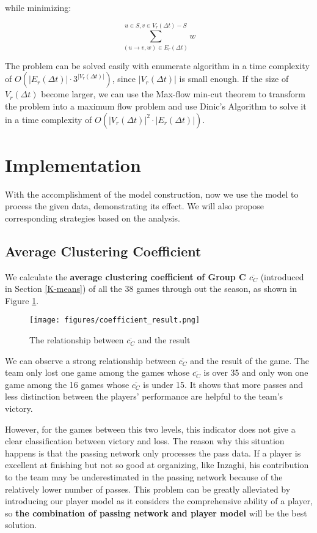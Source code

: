 \documentclass{mcmthesis}
\begin{document}
while minimizing:

$$
    \sum_{(u\rightarrow v, w) \in E_r(\Delta{t})}^{u \in S, v \in V_r(\Delta{t}) - S} w
$$

The problem can be solved easily with enumerate algorithm in a time complexity of $O(|E_r(\Delta{t})|\cdot 3^{|V_r(\Delta{t})|})$, since $|V_r(\Delta{t})|$ is small enough. If the size of $V_r(\Delta{t})$ become larger, we can use the Max-flow min-cut theorem \cite{Wiki_cut_theorem} to transform the problem into a maximum flow problem and use Dinic's Algorithm \cite{Wiki_Dinic} to solve it in a time complexity of $O(|V_r(\Delta{t})|^2\cdot |E_r(\Delta{t})|)$.


\section{Implementation} \label{Sec-Implementation}
With the accomplishment of the model construction, now we use the model to process the given data, demonstrating its effect. We will also propose corresponding strategies based on the analysis.
\subsection{Average Clustering Coefficient}\label{Sec-cc}
We calculate the \textbf{average clustering coefficient of Group C $\overline{c_{C}}$}  (introduced in Section \ref{K-means}) of all the 38 games through out the season, as shown in Figure \ref{cr7}.
\begin{figure}[htbp]
  \centering
  \texttt{[image: figures/coefficient\_result.png]}
  \caption{The relationship between $\overline{c_{C}}$ and the result}\label{cr7}
\end{figure}

We can observe a strong relationship between $\overline{c_{C}}$ and the result of the game. The team only lost one game among the games whose $\overline{c_{C}}$ is over 35 and only won one game among the 16 games whose $\overline{c_{C}}$ is under 15. It shows that more passes and less distinction between the players' performance are helpful to the team's victory.

However, for the games between this two levels, this indicator does not give a clear classification between victory and loss. The reason why this situation happens is that the passing network only processes the pass data. If a player is excellent at finishing but not so good at organizing, like Inzaghi, his contribution to the team may be underestimated in the passing network because of the relatively lower number of passes. This problem can be greatly alleviated by introducing our player model as it considers the comprehensive ability of a player, so \textbf{the combination of passing network and player model} will be the best solution.
\end{document}
